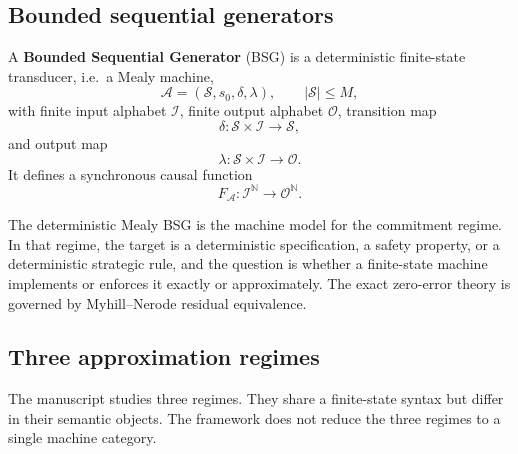 \documentclass[12pt]{article}
\theoremstyle{definition}
\begin{document}
\subsection{Bounded sequential generators}
\label{subsec:bsg-intro}

A \textbf{Bounded Sequential Generator} (BSG) is a deterministic finite-state
transducer, i.e.\ a Mealy machine,
\[
\mathcal A=(\mathcal S,s_0,\delta,\lambda),
\qquad
|\mathcal S|\le M,
\]
with finite input alphabet $\mathcal I$, finite output alphabet $\mathcal O$,
transition map
\[
\delta:\mathcal S\times\mathcal I\to\mathcal S,
\]
and output map
\[
\lambda:\mathcal S\times\mathcal I\to\mathcal O.
\]
It defines a synchronous causal function
\[
F_{\mathcal A}:\mathcal I^{\mathbb N}\to\mathcal O^{\mathbb N}.
\]

The deterministic Mealy BSG is the machine model for the commitment regime.
In that regime, the target is a deterministic specification, a safety
property, or a deterministic strategic rule, and the question is whether a
finite-state machine implements or enforces it exactly or approximately.  The
exact zero-error theory is governed by Myhill--Nerode residual equivalence.

\subsection{Three approximation regimes}
\label{subsec:three-regimes}

The manuscript studies three regimes.  They share a finite-state syntax but
differ in their semantic objects.  The framework does not reduce the three
regimes to a single machine category.
\end{document}
